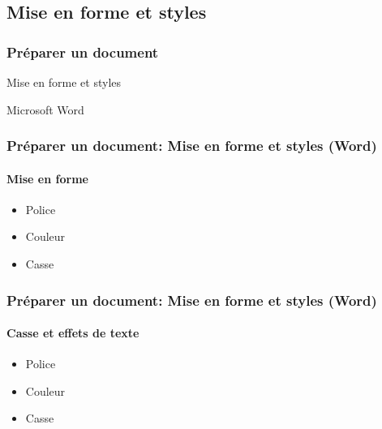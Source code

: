 \documentclass[xcolor=table]{beamer}
\begin{document}
\subsection{Mise en forme et styles}

\begin{frame}
\frametitle{Préparer un document}

\begin{center}
	Mise en forme et styles 
	
	Microsoft Word
\end{center}

\end{frame}

\begin{frame}
\frametitle{Préparer un document: Mise en forme et styles (Word)}
\framesubtitle{Mise en forme}

\begin{minipage}{0.48\textwidth}
	\begin{itemize}
		\item Police
		\item Couleur 
		\item Casse 
	\end{itemize}
\end{minipage}
\begin{minipage}{0.50\textwidth}
	
\end{minipage}

\end{frame}

\begin{frame}
\frametitle{Préparer un document: Mise en forme et styles (Word)}
\framesubtitle{Casse et effets de texte}

\begin{minipage}{0.58\textwidth}
	\begin{itemize}
		\item Police
		\item Couleur 
		\item Casse 
	\end{itemize}
\end{minipage}
\begin{minipage}{0.4\textwidth}
	
\end{minipage}

\end{frame}
\end{document}
